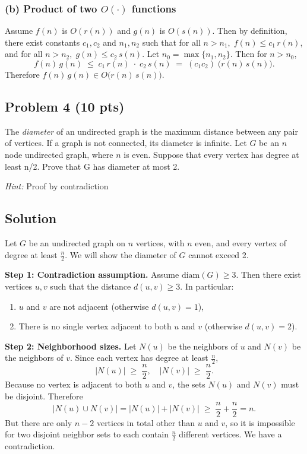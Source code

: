 \documentclass[12pt]{article}
\begin{document}
\subsubsection*{(b) Product of two $O(\cdot)$ functions}

Assume \(f(n)\) is \(O(r(n))\) and \(g(n)\) is \(O(s(n))\). Then by definition, there exist constants \(c_1,c_2\) and \(n_1,n_2\) such that for all \(n>n_1,\; f(n)\le c_1\,r(n)\), and for all \(n>n_2,\; g(n)\le c_2\,s(n)\). Let \(n_0 = \max\{n_1,n_2\}\). Then for \(n>n_0\),
\[
f(n)\,g(n) \;\le\; c_1\,r(n)\;\cdot\;c_2\,s(n)
\;=\; (c_1 c_2)\;\bigl(r(n)\,s(n)\bigr).
\]
Therefore \(f(n)\,g(n)\in O\bigl(r(n)\,s(n)\bigr)\). 

\subsection*{Problem 4 (10 pts)}
The \textit{diameter} of an undirected graph is the maximum distance between any pair of vertices. If a graph is not connected, its diameter is infinite. Let $G$ be an $n$ node undirected graph, where $n$ is even. Suppose that every vertex has degree at least n/2. Prove that G has diameter at most 2.

\textit{Hint:} Proof by contradiction

\subsection*{Solution}

Let \(G\) be an undirected graph on \(n\) vertices, with \(n\) even, and every vertex of degree at least \(\tfrac{n}{2}\). We will show the diameter of \(G\) cannot exceed 2.

\bigskip
\textbf{Step 1: Contradiction assumption.}
Assume \(\mathrm{diam}(G)\ge3\). Then there exist vertices \(u,v\) such that the distance \(d(u,v)\ge3\). In particular:
\begin{enumerate}
    \item \(u\) and \(v\) are not adjacent (otherwise \(d(u,v)=1\)),
    \item There is no single vertex adjacent to both \(u\) and \(v\) (otherwise \(d(u,v)=2\)).
\end{enumerate}

\bigskip
\textbf{Step 2: Neighborhood sizes.}
Let \(N(u)\) be the neighbors of \(u\) and \(N(v)\) be the neighbors of \(v\). Since each vertex has degree at least \(\tfrac{n}{2}\),
\[
|N(u)| \;\ge\; \frac{n}{2}, 
\quad
|N(v)| \;\ge\; \frac{n}{2}.
\]
Because no vertex is adjacent to both \(u\) and \(v\), the sets \(N(u)\) and \(N(v)\) must be disjoint. Therefore
\[
|N(u)\cup N(v)| = |N(u)| + |N(v)|
\;\ge\; \frac{n}{2} + \frac{n}{2}
= n.
\]
But there are only \(n-2\) vertices in total other than \(u\) and \(v\), so it is impossible for two disjoint neighbor sets to each contain \(\tfrac{n}{2}\) different vertices. We have a contradiction.
\end{document}
